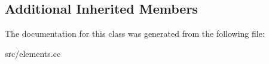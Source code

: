 \subsection*{Additional Inherited Members}


The documentation for this class was generated from the following file\+:\begin{DoxyCompactItemize}
\item 
src/elements.\+cc\end{DoxyCompactItemize}
